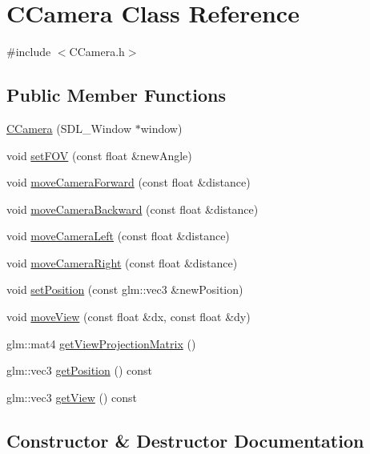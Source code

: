 \hypertarget{class_c_camera}{}\section{C\+Camera Class Reference}
\label{class_c_camera}


{\ttfamily \#include $<$C\+Camera.\+h$>$}

\subsection*{Public Member Functions}
\begin{DoxyCompactItemize}
\item 
\hyperlink{class_c_camera_a9232d37a653d84c16a8a8bb3b5bfbff8}{C\+Camera} (S\+D\+L\+\_\+\+Window $\ast$window)
\item 
void \hyperlink{class_c_camera_affbdf36562521986911a68b729d67c2c}{set\+F\+OV} (const float \&new\+Angle)
\item 
void \hyperlink{class_c_camera_a20b0e75b1c468f3f16c4b1590ffa9535}{move\+Camera\+Forward} (const float \&distance)
\item 
void \hyperlink{class_c_camera_adf3a2867521a918a1d8d64607e779347}{move\+Camera\+Backward} (const float \&distance)
\item 
void \hyperlink{class_c_camera_add12a1c83280b4a172cde12da09755e1}{move\+Camera\+Left} (const float \&distance)
\item 
void \hyperlink{class_c_camera_a0bb4014a4a457e6b3a87d055a7b32edf}{move\+Camera\+Right} (const float \&distance)
\item 
void \hyperlink{class_c_camera_a9f38aa3640d6d8bac7782c5a3ec081ef}{set\+Position} (const glm\+::vec3 \&new\+Position)
\item 
void \hyperlink{class_c_camera_acf5278284f8f4feeaa981b43904c6716}{move\+View} (const float \&dx, const float \&dy)
\item 
glm\+::mat4 \hyperlink{class_c_camera_ae9b4fdf7da7eca2373008ea50840e889}{get\+View\+Projection\+Matrix} ()
\item 
glm\+::vec3 \hyperlink{class_c_camera_afcb8d8999c1f8a14664a520bd1b93fdd}{get\+Position} () const 
\item 
glm\+::vec3 \hyperlink{class_c_camera_a464d8bf89c88c44d243e4632678ef739}{get\+View} () const 
\end{DoxyCompactItemize}


\subsection{Constructor \& Destructor Documentation}
